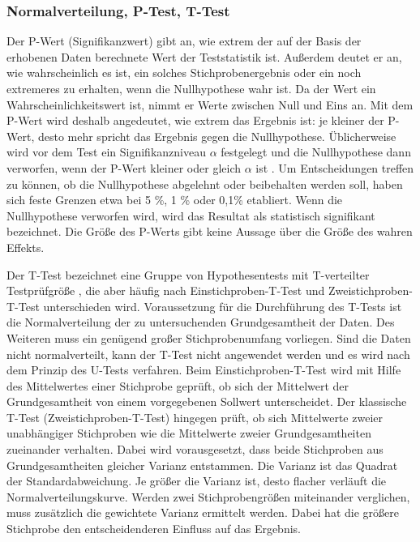\subsubsection{Normalverteilung, P-Test, T-Test}

Der P-Wert (Signifikanzwert) gibt an, wie extrem der auf der Basis der erhobenen Daten berechnete Wert der Teststatistik ist. Außerdem deutet er an, wie wahrscheinlich es ist, ein solches Stichprobenergebnis oder ein noch extremeres zu erhalten, wenn die Nullhypothese wahr ist. Da der Wert ein Wahrscheinlichkeitswert ist, nimmt er Werte zwischen Null und Eins an. Mit dem P-Wert wird deshalb angedeutet, wie extrem das Ergebnis ist: je kleiner der P-Wert, desto mehr spricht das Ergebnis gegen die Nullhypothese. Üblicherweise wird vor dem Test ein Signifikanzniveau $\alpha$ festgelegt und die Nullhypothese dann verworfen, wenn der P-Wert kleiner oder gleich $\alpha$ ist \cite{Akremi:2011}. Um Entscheidungen treffen zu können, ob die Nullhypothese abgelehnt oder beibehalten werden soll, haben sich feste Grenzen etwa bei 5 \%, 1 \% oder 0,1\% etabliert. Wenn die Nullhypothese verworfen wird, wird das Resultat als statistisch signifikant bezeichnet. Die Größe des P-Werts gibt keine Aussage über die Größe des wahren Effekts.

Der T-Test bezeichnet eine Gruppe von Hypothesentests mit T-verteilter Testprüfgröße \cite{Akremi:2011}, die aber häufig nach Einstichproben-T-Test und Zweistichproben-T-Test unterschieden wird. Voraussetzung für die Durchführung des T-Tests ist die Normalverteilung der zu untersuchenden Grundgesamtheit der Daten. Des Weiteren muss ein genügend großer Stichprobenumfang vorliegen. Sind die Daten nicht normalverteilt, kann der T-Test nicht angewendet werden und es wird nach dem Prinzip des U-Tests verfahren. Beim Einstichproben-T-Test wird mit Hilfe des Mittelwertes einer Stichprobe geprüft, ob sich der Mittelwert der Grundgesamtheit von einem vorgegebenen Sollwert unterscheidet. Der klassische T-Test (Zweistichproben-T-Test) hingegen prüft, ob sich Mittelwerte zweier unabhängiger Stichproben wie die Mittelwerte zweier Grundgesamtheiten zueinander verhalten. Dabei wird vorausgesetzt, dass beide Stichproben aus Grundgesamtheiten gleicher Varianz entstammen. Die Varianz ist das Quadrat der Standardabweichung. Je größer die Varianz ist, desto flacher verläuft die Normalverteilungskurve. Werden zwei Stichprobengrößen miteinander verglichen, muss zusätzlich die gewichtete Varianz ermittelt werden. Dabei hat die größere Stichprobe den entscheidenderen Einfluss auf das Ergebnis.

